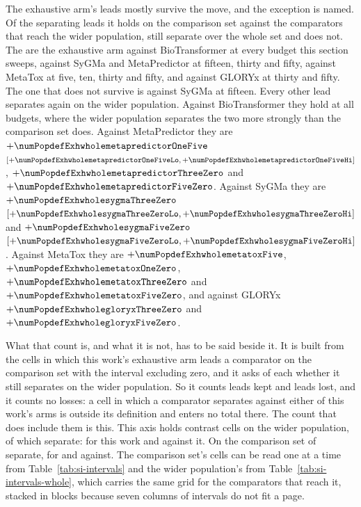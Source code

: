 \documentclass[journal=jcisd8,manuscript=suppinfo,layout=onecolumn]{achemso}
\begin{document}
The exhaustive arm's leads mostly survive the move, and the exception is named. Of the
\numPopdefLeadstotalWord{} separating leads it holds on the comparison set against the
\numPopdefWholearmsWord{} comparators that reach the wider population,
\numPopdefLeadskeptWord{} still separate over the whole set and
\numPopdefLeadslostWord{} does not. The \numPopdefLeadstotalWord{} are the exhaustive arm against
BioTransformer at every budget this section sweeps, against SyGMa and MetaPredictor at fifteen,
thirty and fifty, against MetaTox at five, ten, thirty and fifty, and against GLORYx at thirty and
fifty. The one that does not survive is against SyGMa at fifteen. Every other lead separates again
on the wider population. Against BioTransformer they hold at all \numPopdefMetatoxbudgetsWord{}
budgets, where the wider population separates the two more strongly than the comparison set does.
Against MetaPredictor they are $+\numPopdefExhwholemetapredictorOneFive$
$[+\numPopdefExhwholemetapredictorOneFiveLo, +\numPopdefExhwholemetapredictorOneFiveHi]$,
$+\numPopdefExhwholemetapredictorThreeZero$ and $+\numPopdefExhwholemetapredictorFiveZero$.
Against SyGMa they are $+\numPopdefExhwholesygmaThreeZero$ $[+\numPopdefExhwholesygmaThreeZeroLo,
+\numPopdefExhwholesygmaThreeZeroHi]$ and $+\numPopdefExhwholesygmaFiveZero$
$[+\numPopdefExhwholesygmaFiveZeroLo, +\numPopdefExhwholesygmaFiveZeroHi]$. Against MetaTox they
are $+\numPopdefExhwholemetatoxFive$, $+\numPopdefExhwholemetatoxOneZero$,
$+\numPopdefExhwholemetatoxThreeZero$ and $+\numPopdefExhwholemetatoxFiveZero$, and against GLORYx
$+\numPopdefExhwholegloryxThreeZero$ and $+\numPopdefExhwholegloryxFiveZero$.

What that count is, and what it is not, has to be said beside it. It is built from the cells in
which this work's exhaustive arm leads a comparator on the comparison set with the interval
excluding zero, and it asks of each whether it still separates on the wider population. So it
counts leads kept and leads lost, and it counts no losses: a cell in which a comparator separates
against either of this work's arms is outside its definition and enters no total there. The count
that does include them is this. This axis holds \numPopdefCellswhole{} contrast cells on the wider
population, of which \numPopdefSeparatingwhole{} separate: \numPopdefForthisworkwholeWord{} for
this work and \numPopdefAgainstthisworkwholeWord{} against it. On the comparison set
\numPopdefSeparatingcomp{} of \numPopdefCellscomp{} separate, \numPopdefForthisworkcompWord{} for
and \numPopdefAgainstthisworkcompWord{} against. The comparison set's cells can be read one at a
time from Table~\ref{tab:si-intervals} and the wider population's from
Table~\ref{tab:si-intervals-whole}, which carries the same grid for the \numPopdefWholearmsWord{}
comparators that reach it, stacked in blocks because seven columns of intervals do not fit a page.

\end{document}

